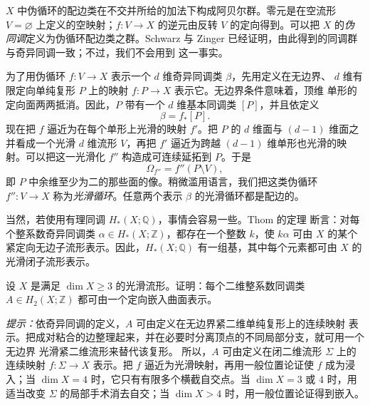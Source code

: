 $X$ 中伪循环的配边类在不交并所给的加法下构成阿贝尔群。零元是在空流形
$V=\varnothing$ 上定义的空映射；$f:V\to X$ 的逆元由反转 $V$ 的定向得到。可以把
$X$ 的\emph{伪同调}定义为伪循环配边类之群。Schwarz  与
Zinger  已经证明，由此得到的同调群与奇异同调一致；不过，我们不会用到
这一事实。

\begin{remark}\label{rem:6-5-3}
为了用伪循环 $f:V\to X$ 表示一个 $d$ 维奇异同调类 $\beta$，先用定义在无边界、
$d$ 维有限定向单纯复形 $P$ 上的映射 $f:P\to X$ 表示它。无边界条件意味着，顶维
单形的定向面两两抵消。因此，$P$ 带有一个 $d$ 维基本同调类 $[P]$，并且依定义
\[
  \beta=f_*[P].
\]
现在把 $f$ 逼近为在每个单形上光滑的映射 $f'$。把 $P$ 的 $d$ 维面与
$(d-1)$ 维面之并看成一个光滑 $d$ 维流形 $V$，再把 $f'$ 逼近为跨越
$(d-1)$ 维单形也光滑的映射。可以把这一光滑化 $f''$ 构造成可连续延拓到 $P$。于是
\[
  \Omega_{f''}=f''(P\setminus V),
\]
即 $P$ 中余维至少为二的那些面的像。稍微滥用语言，我们把这类伪循环
$f'':V\to X$ 称为\emph{光滑循环}。任意两个表示 $\beta$ 的光滑循环都是配边的。
\end{remark}

当然，若使用有理同调 $H_*(X;\mathbb Q)$，事情会容易一些。Thom 的定理
 断言：对每个整系数奇异同调类
$\alpha\in H_*(X;\mathbb Z)$，都存在一个整数 $k$，使 $k\alpha$ 可由 $X$ 的某个
紧定向无边子流形表示。因此，$H_*(X;\mathbb Q)$ 有一组基，其中每个元素都可由
$X$ 的光滑闭子流形表示。

\begin{exercise}\label{ex:6-5-4}
设 $X$ 是满足 $\dim X\ge3$ 的光滑流形。证明：每个二维整系数同调类
$A\in H_2(X;\mathbb Z)$ 都可由一个定向嵌入曲面表示。

\emph{提示：}依奇异同调的定义，$A$ 可由定义在无边界紧二维单纯复形上的连续映射
表示。把成对粘合的边整理起来，并在必要时分离顶点的不同局部分支，就可用一个无边界
光滑紧二维流形来替代该复形。
所以，$A$ 可由定义在闭二维流形 $\Sigma$ 上的连续映射
$f:\Sigma\to X$ 表示。把 $f$ 逼近为光滑映射，再用一般位置论证使 $f$ 成为浸入；当
$\dim X=4$ 时，它只有有限多个横截自交点。当 $\dim X=3$ 或 $4$ 时，用适当改变
$\Sigma$ 的局部手术消去自交；当 $\dim X>4$ 时，用一般位置论证得到嵌入。
\end{exercise}


